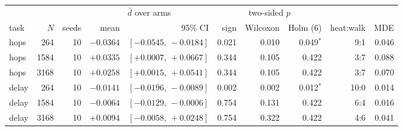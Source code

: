 {\footnotesize\setlength{\tabcolsep}{3.5pt}
\begin{tabular}{@{}lrrrrrrrrr@{}}
\toprule
& & & \multicolumn{2}{c}{$\bar d$ over arms} & \multicolumn{3}{c}{two-sided $p$} & & \\
\cmidrule(lr){4-5}\cmidrule(lr){6-8}
task & $N$ & seeds & mean & 95\% CI & sign & Wilcoxon & Holm (6) & heat:walk & MDE \\
\midrule
hops & 264 & 10 & $-0.0364$ & $[-0.0545,\,-0.0184]$ & 0.021 & 0.010 & 0.049$^{*}$ & 9:1 & 0.046 \\
hops & 1584 & 10 & $+0.0335$ & $[+0.0007,\,+0.0667]$ & 0.344 & 0.105 & 0.422 & 3:7 & 0.088 \\
hops & 3168 & 10 & $+0.0258$ & $[+0.0015,\,+0.0541]$ & 0.344 & 0.105 & 0.422 & 3:7 & 0.070 \\
delay & 264 & 10 & $-0.0141$ & $[-0.0196,\,-0.0089]$ & 0.002 & 0.002 & 0.012$^{*}$ & 10:0 & 0.014 \\
delay & 1584 & 10 & $-0.0064$ & $[-0.0129,\,-0.0006]$ & 0.754 & 0.131 & 0.422 & 6:4 & 0.016 \\
delay & 3168 & 10 & $+0.0094$ & $[-0.0058,\,+0.0248]$ & 0.754 & 0.322 & 0.422 & 4:6 & 0.041 \\
\bottomrule
\end{tabular}
}
